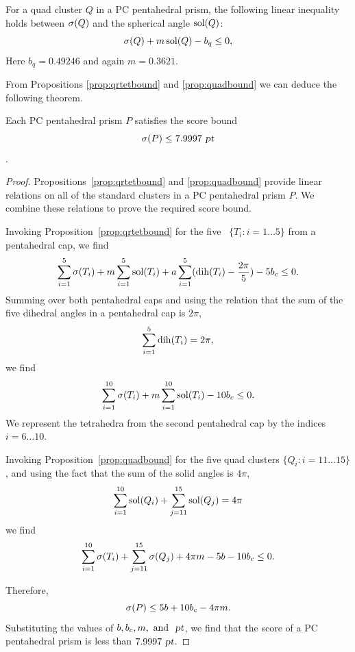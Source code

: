 \begin{prop}
\label{prop:quadbound}
For a quad cluster $Q$ in a PC pentahedral prism, the following linear inequality holds
between $\operatorname{\sigma}(Q)$ and the spherical angle $\operatorname{sol}(Q)$:
\[ \operatorname{\sigma}(Q) + m \operatorname{sol}(Q) - b_q \le 0, \]
Here $b_q = 0.49246$ and again $m = 0.3621$.
\end{prop}

From Propositions \ref{prop:qrtetbound} and \ref{prop:quadbound} we can deduce
the following theorem.

\begin{thm}
\label{thm:dapcbound}
Each PC pentahedral prism  $P$ satisfies the score bound
    \[ \operatorname{\sigma}(P) \le 7.9997 \text{ \sl pt} \].
\end{thm}

\begin{proof}
Propositions~\ref{prop:qrtetbound} and \ref{prop:quadbound} provide linear relations on all of the
standard clusters in a PC pentahedral prism $P$.
We combine these relations to prove the required score bound.

Invoking Proposition~\ref{prop:qrtetbound} for the five \qrtets\ $\{T_i: i=1\dots 5\}$
from a pentahedral cap, we find
\[
\sum_{i=1}^5 \operatorname{\sigma}(T_i) + m \sum_{i=1}^5 \operatorname{sol}(T_i) +
a \sum_{i=1}^5 (\operatorname{dih}(T_i) - \frac{2 \pi}{5}) - 5 b_c \le 0.
\]
Summing over both pentahedral caps and using the relation that
the sum of the five dihedral angles in a pentahedral cap is $2 \pi$,
\[
\sum_{i=1}^5 \operatorname{dih}(T_i) = 2 \pi,
\]
we find
\[
\sum_{i=1}^{10} \operatorname{\sigma}(T_i) + m \sum_{i=1}^{10} \operatorname{sol}(T_i) - 10 b_c \le 0.
\]
We represent the tetrahedra from the second
pentahedral cap by the indices $i=6 \ldots 10$.

Invoking Proposition~\ref{prop:quadbound} for
the five quad clusters $\{Q_i: i=11\ldots 15\}$,
and using the fact that the sum of the solid
angles is $4 \pi$,
\[
 \sum_{i=1}^{10} \operatorname{sol}(Q_i) + \sum_{j=11}^{15} \operatorname{sol}(Q_j) = 4 \pi
\]
we find
\[
\sum_{i=1}^{10} \operatorname{\sigma}(T_i)  + \sum_{j=11}^{15} \operatorname{\sigma}(Q_j) +
4 \pi m - 5 b - 10 b_c \le 0.
\]

Therefore,
\[
\operatorname{\sigma}(P) \le 5 b + 10 b_c - 4 \pi m.
\]
Substituting the values of $b, b_c, m, \text{ and } \text{ \sl pt}$, we find that the
score of a PC pentahedral prism is less than $7.9997 \text{ \sl pt}$.
\end{proof}

